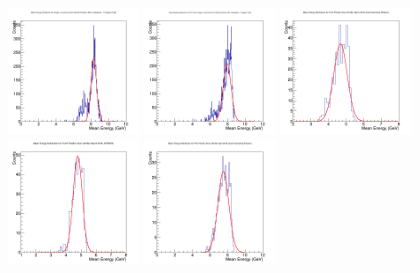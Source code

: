 \documentclass[hidelinks,11pt]{article}
\numberwithin{figure}{section}
\numberwithin{table}{section}
\begin{document}
\begin{figure}[hbtp]
\begin{center}
\includegraphics[width=0.31\textwidth]{Plots/CentralProj/20172ndRMSPlotGausFitted.png}
\includegraphics[width=0.31\textwidth]{Plots/CentralProj/20173rdRMSPlotGausFitted.png}
\includegraphics[width=0.31\textwidth]{Plots/CentralProj/20183rdRMSPlotGausFitted.png}
\includegraphics[width=0.31\textwidth]{Plots/CentralProj/20184thRMSPlotGausFitted.png}
\includegraphics[width=0.31\textwidth]{Plots/CentralProj/20185thRMSPlotGausFitted.png}

\end{center}
\end{figure}
\end{document}
